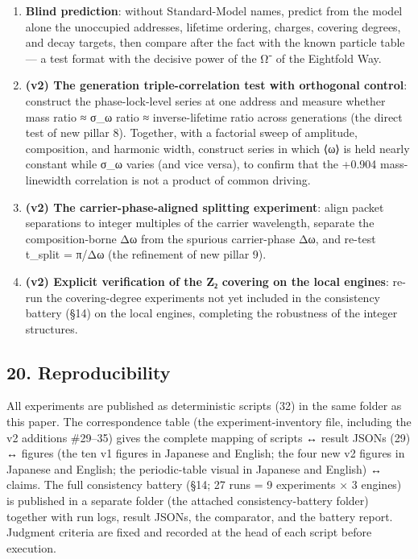 \documentclass[
]{article}
\begin{document}
\begin{enumerate}
  generalizes; if not, there is hidden structure specific to 16.
\item
  \textbf{Blind prediction}: without Standard-Model names, predict from
  the model alone the unoccupied addresses, lifetime ordering, charges,
  covering degrees, and decay targets, then compare after the fact with
  the known particle table --- a test format with the decisive power of
  the Ω⁻ of the Eightfold Way.
\item
  \textbf{(v2) The generation triple-correlation test with orthogonal
  control}: construct the phase-lock-level series at one address and
  measure whether mass ratio ≈ σ\_ω ratio ≈ inverse-lifetime ratio
  across generations (the direct test of new pillar 8). Together, with a
  factorial sweep of amplitude, composition, and harmonic width,
  construct series in which ⟨ω⟩ is held nearly constant while σ\_ω
  varies (and vice versa), to confirm that the +0.904 mass-linewidth
  correlation is not a product of common driving.
\item
  \textbf{(v2) The carrier-phase-aligned splitting experiment}: align
  packet separations to integer multiples of the carrier wavelength,
  separate the composition-borne Δω from the spurious carrier-phase Δω,
  and re-test t\_split = π/Δω (the refinement of new pillar 9).
\item
  \textbf{(v2) Explicit verification of the Z₂ covering on the local
  engines}: re-run the covering-degree experiments not yet included in
  the consistency battery (§14) on the local engines, completing the
  robustness of the integer structures.
\end{enumerate}

\subsection{20. Reproducibility}\label{reproducibility}

All experiments are published as deterministic scripts (32) in the same
folder as this paper. The correspondence table (the experiment-inventory
file, including the v2 additions \#29--35) gives the complete mapping of
scripts ↔ result JSONs (29) ↔ figures (the ten v1 figures in Japanese
and English; the four new v2 figures in Japanese and English; the
periodic-table visual in Japanese and English) ↔ claims. The full
consistency battery (§14; 27 runs = 9 experiments × 3 engines) is
published in a separate folder (the attached consistency-battery folder)
together with run logs, result JSONs, the comparator, and the battery
report. Judgment criteria are fixed and recorded at the head of each
script before execution.
\end{document}
